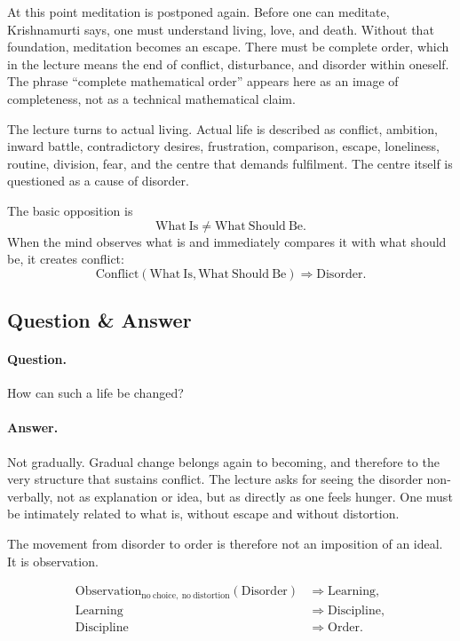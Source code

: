 \documentclass[11pt,oneside]{book}
\begin{document}
At this point meditation is postponed again. Before one can meditate, Krishnamurti says, one must understand living, love, and death. Without that foundation, meditation becomes an escape. There must be complete order, which in the lecture means the end of conflict, disturbance, and disorder within oneself. The phrase ``complete mathematical order'' appears here as an image of completeness, not as a technical mathematical claim.

The lecture turns to actual living. Actual life is described as conflict, ambition, inward battle, contradictory desires, frustration, comparison, escape, loneliness, routine, division, fear, and the centre that demands fulfilment. The centre itself is questioned as a cause of disorder.

The basic opposition is
\begin{equation}
\mathrm{What\ Is} \neq \mathrm{What\ Should\ Be}.
\end{equation}
When the mind observes what is and immediately compares it with what should be, it creates conflict:
\begin{equation}
\mathrm{Conflict}(\mathrm{What\ Is},\mathrm{What\ Should\ Be})
\Rightarrow
\mathrm{Disorder}.
\end{equation}

\subsection{Question \& Answer}

\paragraph{Question.}
How can such a life be changed?

\paragraph{Answer.}
Not gradually. Gradual change belongs again to becoming, and therefore to the very structure that sustains conflict. The lecture asks for seeing the disorder non-verbally, not as explanation or idea, but as directly as one feels hunger. One must be intimately related to what is, without escape and without distortion.

The movement from disorder to order is therefore not an imposition of an ideal. It is observation.

\begin{align}
\mathrm{Observation}_{\mathrm{no\ choice,\ no\ distortion}}(\mathrm{Disorder})
&\Rightarrow \mathrm{Learning},\\
\mathrm{Learning} &\Rightarrow \mathrm{Discipline},\\
\mathrm{Discipline} &\Rightarrow \mathrm{Order}.
\end{align}
\end{document}
